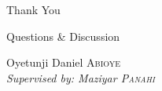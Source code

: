 \documentclass[aspectratio=169, 11pt]{beamer}
\begin{document}
\begin{frame}[plain]
    \begin{center}
        \Huge \textcolor{ulblue}{Thank You}
        
        \vspace{1cm}
        
        \Large Questions \& Discussion
        
        \vspace{1.5cm}
        
        
        \vspace{0.5cm}
        
        \normalsize
        Oyetunji Daniel \textsc{Abioye}\\
        \textit{Supervised by: Maziyar \textsc{Panahi}}
    \end{center}
\end{frame}
\end{document}
